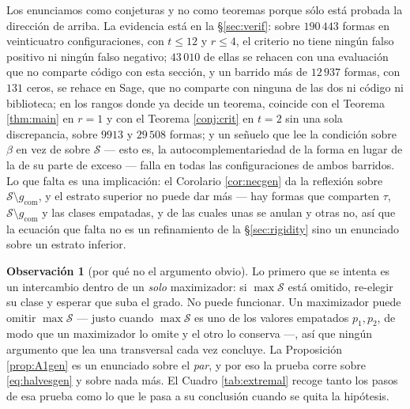 \documentclass[11pt,reqno]{amsart}
\theoremstyle{plain}
\theoremstyle{definition}
\newtheorem{remark}[theorem]{Observación}
\begin{document}
Los enunciamos como conjeturas y no como teoremas porque sólo está probada la dirección de arriba. La
evidencia está en la \S\ref{sec:verif}: sobre $190\,443$ formas en veinticuatro configuraciones, con
$t\le12$ y $r\le4$, el criterio no tiene ningún falso positivo ni ningún falso negativo; $43\,010$
de ellas se rehacen con una evaluación que no comparte código con esta sección, y un barrido más de
$12\,937$ formas, con $131$ ceros, se rehace en Sage, que no comparte con ninguna de las dos ni
código ni biblioteca; en los rangos donde ya
decide un teorema, coincide con el Teorema \ref{thm:main} en $r=1$ y con el Teorema \ref{conj:crit} en
$t=2$ sin una sola discrepancia, sobre $9913$ y $29\,508$ formas; y un señuelo que lee la condición
sobre $\beta$ en vez de sobre $\mathcal{S}$ --- esto es, la autocomplementariedad de la forma en lugar
de la de su parte de exceso --- falla en todas las configuraciones de ambos barridos. Lo que falta es
una implicación: el Corolario \ref{cor:necgen} da la reflexión sobre $\mathcal{S}\setminus
g_{\mathrm{com}}$, y el estrato superior no puede dar más --- hay formas que comparten $\tau$,
$\mathcal{S}\setminus g_{\mathrm{com}}$ y las clases empatadas, y de las cuales unas se anulan y otras
no, así que la ecuación que falta no es un refinamiento de la \S\ref{sec:rigidity} sino un enunciado
sobre un estrato inferior.

\begin{remark}[por qué no el argumento obvio]
Lo primero que se intenta es un intercambio dentro de un \emph{solo} maximizador: si
$\max\mathcal{S}$ está omitido, re-elegir su clase y esperar que suba el grado. No puede funcionar.
Un maximizador puede omitir $\max\mathcal{S}$ --- justo cuando $\max\mathcal{S}$ es uno de los valores
empatados $p_1,p_2$, de modo que un maximizador lo omite y el otro lo conserva ---, así que ningún
argumento que lea una transversal cada vez concluye. La Proposición \ref{prop:A1gen} es un enunciado
sobre el \emph{par}, y por eso la prueba corre sobre \eqref{eq:halvesgen} y sobre nada más. El Cuadro
\ref{tab:extremal} recoge tanto los pasos de esa prueba como lo que le pasa a su conclusión cuando se
quita la hipótesis.
\end{remark}
\end{document}
